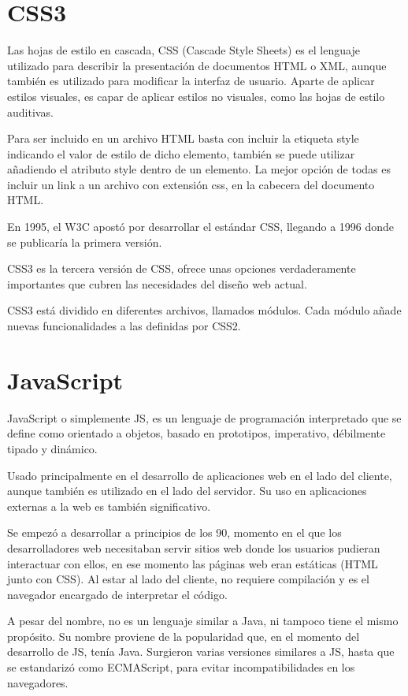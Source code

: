 \section{CSS3} 
\label{sec:css3}


Las hojas de estilo en cascada, CSS (Cascade Style Sheets) es el lenguaje utilizado para describir la presentación de documentos HTML o XML, aunque también es utilizado para modificar la interfaz de usuario. Aparte de aplicar estilos visuales, es capar de aplicar estilos no visuales, como las hojas de estilo auditivas. 


Para ser incluido en un archivo HTML basta con incluir la etiqueta style indicando el valor de estilo de dicho elemento, también se puede utilizar añadiendo el atributo style dentro de un elemento. La mejor opción de todas es incluir un link a un archivo con extensión css, en la cabecera del documento HTML.


En 1995, el W3C apostó por desarrollar el estándar CSS, llegando a 1996 donde se publicaría la primera versión. 


CSS3 es la tercera versión de CSS, ofrece unas opciones verdaderamente importantes que cubren las necesidades del diseño web actual.


CSS3 está dividido en diferentes archivos, llamados módulos. Cada módulo añade nuevas funcionalidades a las definidas por CSS2. 

\section{JavaScript} 
\label{sec:javascript}


JavaScript o simplemente JS, es un lenguaje de programación interpretado que se define como orientado a objetos, basado en prototipos, imperativo, débilmente tipado y dinámico. 


Usado principalmente en el desarrollo de aplicaciones web en el lado del cliente, aunque también es utilizado en el lado del servidor. Su uso en aplicaciones externas a la web es también significativo.


Se empezó a desarrollar a principios de los 90, momento en el que los desarrolladores web necesitaban servir sitios web donde los usuarios pudieran interactuar con ellos, en ese momento las páginas web eran estáticas (HTML junto con CSS). Al estar al lado del cliente, no requiere compilación y es el navegador encargado de interpretar el código.


A pesar del nombre, no es un lenguaje similar a Java, ni tampoco tiene el mismo propósito. Su nombre proviene de la popularidad que, en el momento del desarrollo de JS, tenía Java. Surgieron varias versiones similares a JS, hasta que se estandarizó como ECMAScript, para evitar incompatibilidades en los navegadores.


